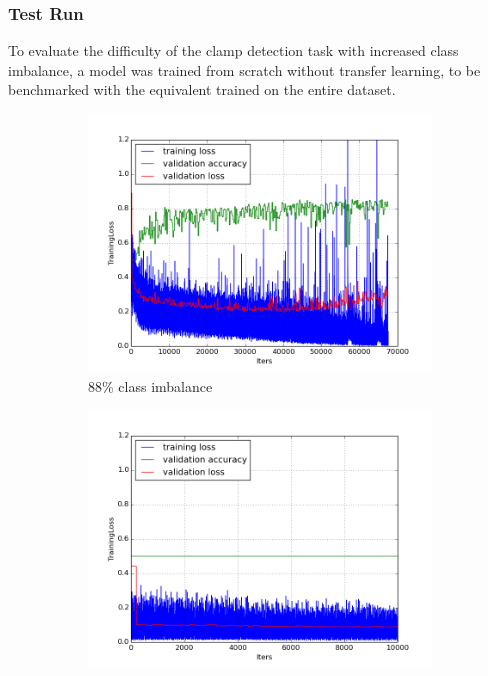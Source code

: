 \documentclass[a4paper,11pt]{article}
\begin{document}
\subsubsection{Test Run}

To evaluate the difficulty of the clamp detection task with increased class imbalance, a model was trained from scratch without transfer learning, to be benchmarked with the equivalent trained on the entire dataset. 

\begin{figure}
    \centering
    \begin{minipage}[b]{\textwidth}
      \begin{subfigure}{.5\textwidth} 
        \centering
        \includegraphics[scale=0.4]{images/plot_clampdet_tl_wout.png}
        \caption{88\% class imbalance}\label{fig:2a}
      \end{subfigure}%
      \begin{subfigure}{.5\textwidth} 
        \centering
        \includegraphics[scale=0.4]{images/plot_clampdetCI98_tl_wout.png}

\end{subfigure}
\end{minipage}
\end{figure}
\end{document}
